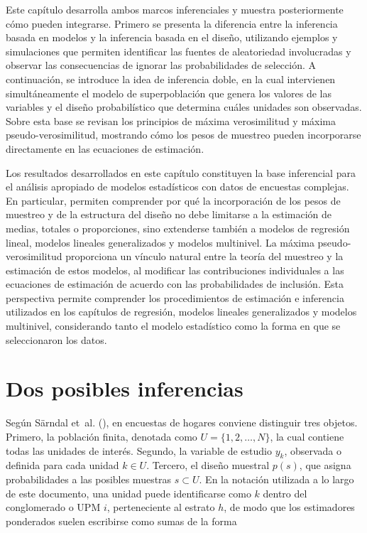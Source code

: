 \documentclass[
  spanish,
  11pt,
  letterpaper,
  oneside,
  open=any]{scrbook}
\begin{document}
Este capítulo desarrolla ambos marcos inferenciales y muestra
posteriormente cómo pueden integrarse. Primero se presenta la diferencia
entre la inferencia basada en modelos y la inferencia basada en el
diseño, utilizando ejemplos y simulaciones que permiten identificar las
fuentes de aleatoriedad involucradas y observar las consecuencias de
ignorar las probabilidades de selección. A continuación, se introduce la
idea de inferencia doble, en la cual intervienen simultáneamente el
modelo de superpoblación que genera los valores de las variables y el
diseño probabilístico que determina cuáles unidades son observadas.
Sobre esta base se revisan los principios de máxima verosimilitud y
máxima pseudo-verosimilitud, mostrando cómo los pesos de muestreo pueden
incorporarse directamente en las ecuaciones de estimación.

Los resultados desarrollados en este capítulo constituyen la base
inferencial para el análisis apropiado de modelos estadísticos con datos
de encuestas complejas. En particular, permiten comprender por qué la
incorporación de los pesos de muestreo y de la estructura del diseño no
debe limitarse a la estimación de medias, totales o proporciones, sino
extenderse también a modelos de regresión lineal, modelos lineales
generalizados y modelos multinivel. La máxima pseudo-verosimilitud
proporciona un vínculo natural entre la teoría del muestreo y la
estimación de estos modelos, al modificar las contribuciones
individuales a las ecuaciones de estimación de acuerdo con las
probabilidades de inclusión. Esta perspectiva permite comprender los
procedimientos de estimación e inferencia utilizados en los capítulos de
regresión, modelos lineales generalizados y modelos multinivel,
considerando tanto el modelo estadístico como la forma en que se
seleccionaron los datos.

\section{Dos posibles inferencias}\label{dos-posibles-inferencias}

Según Särndal et~al. (), en
encuestas de hogares conviene distinguir tres objetos. Primero, la
población finita, denotada como \(U = \{1,2,\ldots,N\}\), la cual
contiene todas las unidades de interés. Segundo, la variable de estudio
\(y_k\), observada o definida para cada unidad \(k \in U\). Tercero, el
diseño muestral \(p(s)\), que asigna probabilidades a las posibles
muestras \(s \subset U\). En la notación utilizada a lo largo de este
documento, una unidad puede identificarse como \(k\) dentro del
conglomerado o UPM \(i\), perteneciente al estrato \(h\), de modo que
los estimadores ponderados suelen escribirse como sumas de la forma
\end{document}
